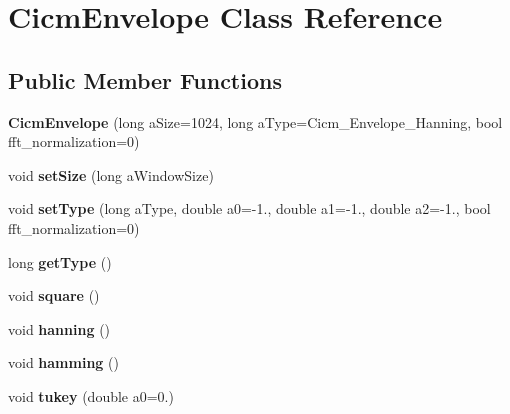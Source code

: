 \hypertarget{class_cicm_envelope}{\section{Cicm\-Envelope Class Reference}
\label{class_cicm_envelope}
}
\subsection*{Public Member Functions}
\begin{DoxyCompactItemize}
\item 
\hypertarget{class_cicm_envelope_a698e532bf93683e1a4653a2d8aa4cfe4}{{\bfseries Cicm\-Envelope} (long a\-Size=1024, long a\-Type=Cicm\-\_\-\-Envelope\-\_\-\-Hanning, bool fft\-\_\-normalization=0)}\label{class_cicm_envelope_a698e532bf93683e1a4653a2d8aa4cfe4}

\item 
\hypertarget{class_cicm_envelope_ab212f2d0f392431ccb023a8077b3af3a}{void {\bfseries set\-Size} (long a\-Window\-Size)}\label{class_cicm_envelope_ab212f2d0f392431ccb023a8077b3af3a}

\item 
\hypertarget{class_cicm_envelope_af6027a0eac74b76c32dbeb8b69f0bdae}{void {\bfseries set\-Type} (long a\-Type, double a0=-\/1., double a1=-\/1., double a2=-\/1., bool fft\-\_\-normalization=0)}\label{class_cicm_envelope_af6027a0eac74b76c32dbeb8b69f0bdae}

\item 
\hypertarget{class_cicm_envelope_a67d241fe75bfd7ac689fa47b49557ffb}{long {\bfseries get\-Type} ()}\label{class_cicm_envelope_a67d241fe75bfd7ac689fa47b49557ffb}

\item 
\hypertarget{class_cicm_envelope_a347d3d10bdb2fd123c8cabfa3d0fcf42}{void {\bfseries square} ()}\label{class_cicm_envelope_a347d3d10bdb2fd123c8cabfa3d0fcf42}

\item 
\hypertarget{class_cicm_envelope_a5f8d334281f7434b3d122d57c9f8ee8f}{void {\bfseries hanning} ()}\label{class_cicm_envelope_a5f8d334281f7434b3d122d57c9f8ee8f}

\item 
\hypertarget{class_cicm_envelope_a67b606aa7ee9cb2d47ca9de213d22d81}{void {\bfseries hamming} ()}\label{class_cicm_envelope_a67b606aa7ee9cb2d47ca9de213d22d81}

\item 
\hypertarget{class_cicm_envelope_a9a9849e8c3a6f32bcb05d89d992dd393}{void {\bfseries tukey} (double a0=0.)}\label{class_cicm_envelope_a9a9849e8c3a6f32bcb05d89d992dd393}


\end{DoxyCompactItemize}

